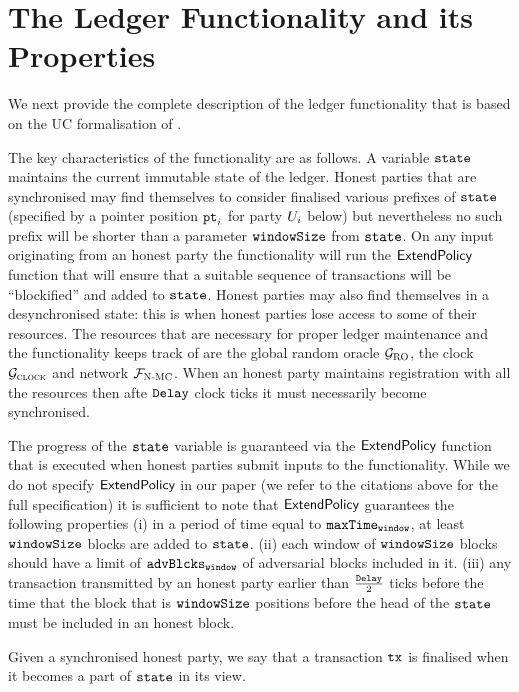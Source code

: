 




\section{The Ledger Functionality and its Properties} 
We next provide the complete description of the ledger functionality that is based on the UC formalisation of 
\cite{BMTZ17,genesis}. 

The key characteristics of the functionality are as follows. 
A variable $\texttt{state}$ maintains the current immutable state of the ledger. 
Honest parties that are synchronised may find themselves  to consider finalised 
various prefixes of $\texttt{state}$ (specified by a pointer position $\texttt{pt}_{i}$  for party
$U_i$ below) but nevertheless no such prefix will be shorter than a parameter
$\texttt{windowSize}$ from $\texttt{state}$. On any input originating from an honest party 
the functionality will run the $\textsf{ExtendPolicy}$ function that will ensure that
a suitable sequence of transactions will be ``blockified'' and added
to $\texttt{state}$. Honest parties may also find themselves in a desynchronised
state: this is when honest parties lose access to some of their resources.
The resources that are necessary for proper ledger maintenance 
and the functionality
keeps track of are the global random oracle $\mathcal{G}_{\textsc{RO}}$, the clock $\mathcal{G}_{\textsc{clock}}$
and network $\mathcal{F}_{\textsc{N-MC}}$. 
When an honest party maintains registration with all the resources
then afte $\texttt{Delay}$ clock ticks it must necessarily become synchronised. 

The progress of the $\texttt{state}$ variable is guaranteed via 
the $\textsf{ExtendPolicy}$ function that is executed when honest parties
submit inputs to the functionality. 
While we do not specify $\textsf{ExtendPolicy}$ in our paper
(we refer to the citations above for the full specification)
it is sufficient to note that $\textsf{ExtendPolicy}$ guarantees
the following properties  
(i) in a period of time equal to $\texttt{maxTime}_\texttt{window}$, 
at least $\texttt{windowSize}$ blocks are added
to  $\texttt{state}$. 
(ii) each window of $\texttt{windowSize}$ blocks should have a limit of $\texttt{advBlcks}_\texttt{window}$ of adversarial blocks included in it. 
(iii) 
any transaction transmitted by an honest party earlier than
$\frac{\texttt{Delay}}{2}$ ticks before the time 
that the  block that is $\texttt{windowSize}$ positions before the head
of the $\texttt{state}$ must be included in an honest block. 

Given a synchronised honest party, we say that a transaction
$\texttt{tx}$ is finalised when it becomes a part of $\texttt{state}$ in its view. 

